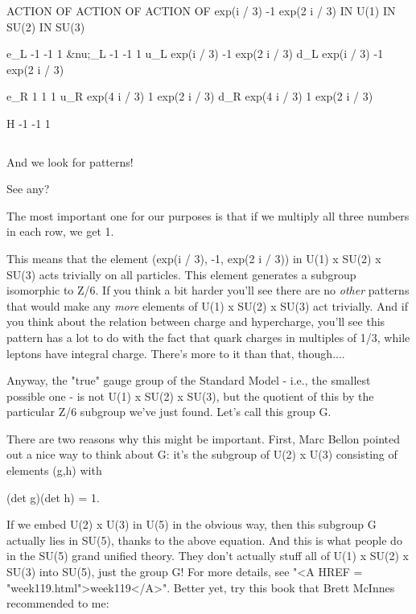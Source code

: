          ACTION OF            ACTION OF             ACTION OF
       exp(\pi  i / 3)            -1               exp(2 \pi  i / 3)
          IN U(1)             IN SU(2)               IN SU(3)

e_L         -1                  -1                     1
&nu;_L        -1                  -1                     1
u_L     exp(\pi  i / 3)           -1               exp(2 \pi  i / 3)
d_L     exp(\pi  i / 3)           -1               exp(2 \pi  i / 3)

e_R          1                   1                     1
u_R     exp(4 \pi  i / 3)          1               exp(2 \pi  i / 3)
d_R     exp(4 \pi  i / 3)          1               exp(2 \pi  i / 3)


 H          -1                  -1                     1

$$
    
And we look for patterns!  

See any?

The most important one for our purposes is that if we multiply all three
numbers in each row, we get 1. 

This means that the element (exp(\pi  i / 3), -1, exp(2 \pi  i / 3)) in U(1)
x SU(2) x SU(3) acts trivially on all particles.  This element generates
a subgroup isomorphic to Z/6.  If you think a bit harder you'll see
there are no \emph{other} patterns that would make any \emph{more} elements of
U(1) x SU(2) x SU(3) act trivially.  And if you think about the relation
between charge and hypercharge, you'll see this pattern has a lot to do
with the fact that quark charges in multiples of 1/3, while leptons have
integral charge.  There's more to it than that, though....

Anyway, the "true" gauge group of the Standard Model - i.e., the
smallest possible one - is not U(1) x SU(2) x SU(3), but the quotient of
this by the particular Z/6 subgroup we've just found.  Let's call 
this group G.  

There are two reasons why this might be important.  First, Marc Bellon
pointed out a nice way to think about G: it's the subgroup of U(2) x U(3) 
consisting of elements (g,h) with

(det g)(det h) = 1.

If we embed U(2) x U(3) in U(5) in the obvious way, then this subgroup G
actually lies in SU(5), thanks to the above equation.  And this is what
people do in the SU(5) grand unified theory.  They don't actually stuff
all of U(1) x SU(2) x SU(3) into SU(5), just the group G!  For more
details, see "<A HREF = "week119.html">week119</A>".  Better
yet, try this book that Brett McInnes recommended to me:

